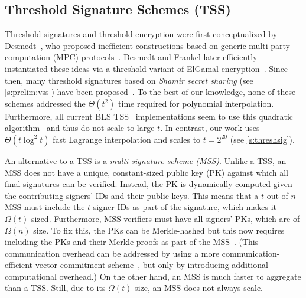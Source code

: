 
\subsection{Threshold Signature Schemes (TSS)}
\label{s:related-work:tss}

Threshold signatures and threshold encryption were first conceptualized by Desmedt~\cite{Desmedt87}, who proposed inefficient constructions based on generic multi-party computation (MPC) protocols~\cite{GMW87}.
Desmedt and Frankel later efficiently instantiated these ideas via a threshold-variant of ElGamal encryption~\cite{DF90}.
Since then, many threshold signatures based on \textit{Shamir secret sharing} (see \cref{s:prelim:vss}) have been proposed~\cite{DesmedtFrankel1992SharedGeneration,Shoup00,Harn94,GJKR96,SS01,Boldyreva03,GGN16,PK96}.
To the best of our knowledge, none of these schemes addressed the $\Theta(t^2)$ time required for polynomial interpolation.
Furthermore, all current BLS TSS~\cite{Boldyreva03} implementations seem to use this quadratic algorithm~\cite{bls-chia-impl,bls-sbft-impl,bls-dfinity-impl,bls-herumi-impl} and thus do not scale to large $t$.
In contrast, our work uses $\Theta(t\log^2{t})$ fast Lagrange interpolation and scales to $t = 2^{20}$ (see \cref{s:threshsig}).

An alternative to a TSS is a \textit{multi-signature scheme (MSS)}.
Unlike a TSS, an MSS does not have a unique, constant-sized public key (PK) against which all final signatures can be verified.
Instead, the PK is dynamically computed given the contributing signers' IDs and their public keys.
This means that a $t$-out-of-$n$ MSS must include the $t$ signer IDs as part of the signature, which makes it $\Omega(t)$-sized.
Furthermore, MSS verifiers must have all signers' PKs, which are of $\Omega(n)$ size.
To fix this, the PKs can be Merkle-hashed but this now requires including the PKs and their Merkle proofs as part of the MSS~\cite{STV+16}.
(This communication overhead can be addressed by using a more communication-efficient vector commitment scheme~\cite{CF13}, but only by introducing additional computational overhead.)
On the other hand, an MSS is much faster to aggregate than a TSS.
Still, due to its $\Omega(t)$ size, an MSS does not always scale.

